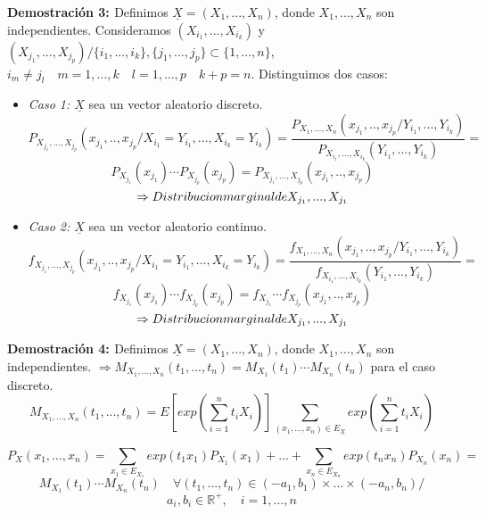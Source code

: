 \documentclass[a4paper, 12pt]{article}
\def\R{\mathds{R}}
\begin{document}
    \newpage

    {\bf{Demostración 3: }} 
    Definimos $\underline{X}=(X_1,...,X_n)$, donde $X_1,...,X_n$ son independientes.
    Consideramos $(X_{i_1},...,X_{i_k})$ y $(X_{j_1},...,X_{j_p})/ \{i_1,...,i_k\},\{j_1,...,j_p\} \subset \{1,...,n\}$,
    $i_m \neq j_l \quad m=1,...,k \quad l=1,...,p \quad k+p=n$. Distinguimos dos casos:
    \begin{itemize}
        \item {\it{Caso 1: }}  $\underline{X}$ sea un vector aleatorio discreto.
        $$P_{X_{j_1},...,X_{j_p}}(x_{j_1},..,x_{j_p}/X_{i_1}=Y_{i_1},...,X_{i_k}=Y_{i_k})=
        \frac{P_{X_1,...,X_n}(x_{j_1},..,x_{j_p}/Y_{i_1},...,Y_{i_k})}{P_{X_{i_1},...,X_{i_k}}(Y_{i_1},...,Y_{i_k})}=
        $$$$P_{X_{j_1}}(x_{j_1}) \cdots P_{X_{j_p}}(x_{j_p})=P_{X_{j_1},...,X_{j_p}}(x_{j_1},..,x_{j_p})
        $$$$\Rightarrow \mathnormal{Distribucion marginal de } X_{j_1},...,X_{j_1}$$
        
        \item {\it{Caso 2: }}  $\underline{X}$ sea un vector aleatorio continuo.
        $$f_{X_{j_1},...,X_{j_p}}(x_{j_1},..,x_{j_p}/X_{i_1}=Y_{i_1},...,X_{i_k}=Y_{i_k})=
        \frac{f_{X_1,...,X_n}(x_{j_1},..,x_{j_p}/Y_{i_1},...,Y_{i_k})}{f_{X_{i_1},...,X_{i_k}}(Y_{i_1},...,Y_{i_k})}=
        $$$$f_{X_{j_1}}(x_{j_1}) \cdots f_{X_{j_p}}(x_{j_p})=f_{X_{j_1}} \cdots f_{X_{j_p}}(x_{j_1},..,x_{j_p})
        $$$$\Rightarrow \mathnormal{Distribucion marginal de } X_{j_1},...,X_{j_1}$$
    \end{itemize}

    \newpage

    {\bf{Demostración 4: }} 
    Definimos $\underline{X}=(X_1,...,X_n)$, donde $X_1,...,X_n$ son independientes.
    $\Rightarrow M_{X_1,...,X_n}(t_1,...,t_n)=M_{X_1}(t_1) \cdots M_{X_n}(t_n)$ para el caso discreto.
    $$M_{X_1,...,X_n}(t_1,...,t_n)=E\left[exp\left(\sum_{i=1}^n t_iX_i\right)\right]
    \sum _{(x_1,...,x_n) \in E_{\underline{X}}} exp\left(\sum_{i=1}^n t_iX_i\right)$$

    $$P_X(x_1,...,x_n)=\sum _{x_1 \in E_{X_1}}exp(t_1 x_1)P_{X_1}(x_1) + ... + \sum _{x_n \in E_{X_n}}exp(t_n x_n)P_{X_n}(x_n)=
    $$$$M_{X_1}(t_1) \cdots M_{X_n}(t_n) \quad \forall (t_1,...,t_n) \in (-a_1,b_1)\times ... \times (-a_n,b_n) /
    $$$$a_i,b_i \in \R^+, \quad i=1,...,n$$
\end{document}
